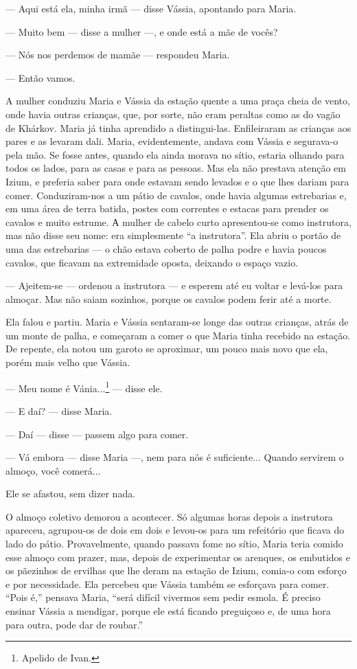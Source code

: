 --- Aqui está ela, minha irmã --- disse Vássia, apontando para Maria.

--- Muito bem --- disse a mulher ---, e onde está a mãe de vocês?

--- Nós nos perdemos de mamãe --- respondeu Maria.

--- Então vamos.

A mulher conduziu Maria e Vássia da estação quente a uma praça cheia de
vento, onde havia outras crianças, que, por sorte, não eram peraltas
como as do vagão de Khárkov. Maria já tinha aprendido a distingui-las.
Enfileiraram as crianças aos pares e as levaram dali. Maria,
evidentemente, andava com Vássia e segurava-o pela mão. Se fosse antes,
quando ela ainda morava no sítio, estaria olhando para todos os lados,
para as casas e para as pessoas. Mas ela não prestava atenção em Izium,
e preferia saber para onde estavam sendo levados e o que lhes dariam
para comer. Conduziram-nos a um pátio de cavalos, onde havia algumas
estrebarias e, em uma área de terra batida, postes com correntes e
estacas para prender os cavalos e muito estrume. А mulher de cabelo
curto apresentou-se como instrutora, mas não disse seu nome: era
simplesmente ``a instrutora''. Ela abriu o portão de uma das estrebarias
--- o chão estava coberto de palha podre e havia poucos cavalos, que
ficavam na extremidade oposta, deixando o espaço vazio.

--- Ajeitem-se --- ordenou a instrutora --- e esperem até eu voltar e
levá-los para almoçar. Mas não saiam sozinhos, porque os cavalos podem
ferir até a morte.

Ela falou e partiu. Maria e Vássia sentaram-se longe das outras
crianças, atrás de um monte de palha, e começaram a comer o que Maria
tinha recebido na estação. De repente, ela notou um garoto se aproximar,
um pouco mais novo que ela, porém mais velho que Vássia.

--- Meu nome é Vánia...\footnote{Apelido de Ivan.} --- disse ele.

--- E daí? --- disse Maria.

--- Daí --- disse --- passem algo para comer.

--- Vá embora --- disse Maria ---, nem para nós é suficiente... Quando
servirem o almoço, você comerá...

Ele se afastou, sem dizer nada.

O almoço coletivo demorou a acontecer. Só algumas horas depois a
instrutora apareceu, agrupou-os de dois em dois e levou-os para um
refeitório que ficava do lado do pátio. Provavelmente, quando passava
fome no sítio, Maria teria comido esse almoço com prazer, mas, depois de
experimentar os arenques, os embutidos e os pãezinhos de ervilhas que
lhe deram na estação de Izium, comia-o com esforço e por necessidade.
Ela percebeu que Vássia também se esforçava para comer. ``Pois é,''
pensava Maria, ``será difícil vivermos sem pedir esmola. É preciso
ensinar Vássia a mendigar, porque ele está ficando preguiçoso e, de uma
hora para outra, pode dar de roubar.''

